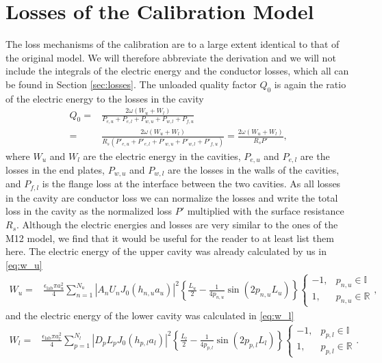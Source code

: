 \section{Losses of the Calibration Model}
The loss mechanisms of the calibration are to a large extent identical to that of the original model. We will therefore abbreviate the derivation and we will not include the integrals of the electric energy and the conductor losses, which all can be found in Section \ref{sec:losses}. The unloaded quality factor $Q_0$ is again the ratio of the electric energy to the losses in the cavity
\begin{align}
Q_0 =& \frac{2\omega(W_u+W_l)}{P_{e,u}+P_{e,l}+P_{w,u}+P_{w,l}+P_{f,u}}\\=&\frac{2\omega(W_u+W_l)}{R_s(P'_{e,u}+P'_{e,l}+P'_{w,u}+P'_{w,l}+P'_{f,u})} = \frac{2\omega(W_u+W_l)}{R_sP'}\text{,}
\end{align}
where $W_u$ and $W_l$ are the electric energy in the cavities, $P_{e,u}$ and $P_{e,l}$ are the losses in the end plates, $P_{w,u}$ and $P_{w,l}$ are the losses in the walls of the cavities, and $P_{f,l}$ is the flange loss at the interface between the two cavities. As all losses in the cavity are conductor loss we can normalize the losses and write the total loss in the cavity as the normalized loss $P'$ multiplied with the surface resistance $R_s$. Although the electric energies and losses are very similar to the ones of the M12 model, we find that it would be useful for the reader to at least list them here. The electric energy of the upper cavity was already calculated by us in \eqref{eq:w_u}
\begin{align}
W_u =& \frac{\epsilon_{\text{lab}}\pi a_u^2}{4}\sum\limits_{n=1}^{N_u}|A_nU_nJ_0(h_{n,u}a_u)|^2\left\lbrace\frac{L_u}{2}-\frac{1}{4p_{n,u}}\sin(2p_{n,u}L_u)\right\rbrace\begin{cases}-1, &p_{n,u}\in\mathbb{I}\\1, &p_{n,u}\in\mathbb{R}\end{cases}\text{,}
 \end{align}
and the electric energy of the lower cavity was calculated in \eqref{eq:w_l}
  \begin{align}
W_l =& \frac{\epsilon_{\text{lab}}\pi a_l^2}{4}\sum\limits_{p=1}^{N_l}|D_pL_pJ_0(h_{p,l}a_l)|^2\left\lbrace\frac{L_l}{2}-\frac{1}{4p_{p,l}}\sin(2p_{p,l}L_l)\right\rbrace\begin{cases}-1, &p_{p,l}\in\mathbb{I}\\1, &p_{p,l}\in\mathbb{R}\end{cases}\text{.}
 \end{align}
